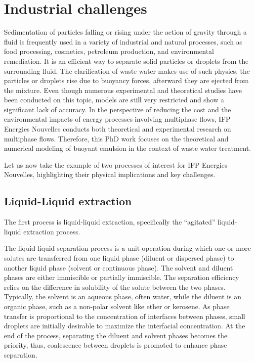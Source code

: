 


\section{Industrial challenges} 


Sedimentation of particles falling or rising under the action of gravity through a fluid is frequently used in a variety of industrial and natural processes, such as food processing, cosmetics, petroleum production, and environmental remediation. 
It is an efficient way to separate solid particles or droplets from the surrounding fluid. 
The clarification of waste water makes use of such physics, the particles or droplets rise due to buoyancy forces, afterward they are ejected from the mixture.
Even though numerous experimental and theoretical studies have been conducted on this topic, models are still very restricted and show a significant lack of accuracy. 
In the perspective of reducing the cost and the environmental impacts of energy processes involving multiphase flows, IFP Energies Nouvelles conducts both theoretical and experimental research on multiphase flows.
Therefore, this PhD work focuses on the theoretical and numerical modeling of buoyant emulsion in the context of waste water treatment.  

Let us now take the example of two processes of interest for IFP Energies Nouvelles, highlighting their physical implications and key challenges.  


\subsection{Liquid-Liquid extraction}


The first process is liquid-liquid extraction, specifically the ``agitated'' liquid-liquid extraction process. 

The liquid-liquid separation process is a unit operation during which one or more solutes are transferred from one liquid phase (diluent or dispersed phase) to another liquid phase (solvent or continuous phase).
The solvent and diluent phases are either immiscible or partially immiscible.
The separation efficiency relies on the difference in solubility of the solute between the two phases.
Typically, the solvent is an aqueous phase, often water, while the diluent is an organic phase, such as a non-polar solvent like ether or kerosene.
As phase transfer is proportional to the concentration of interfaces between phases, small droplets are initially desirable to maximize the interfacial concentration.
At the end of the process, separating the diluent and solvent phases becomes the priority, thus, coalescence between droplets is promoted to enhance phase separation.

